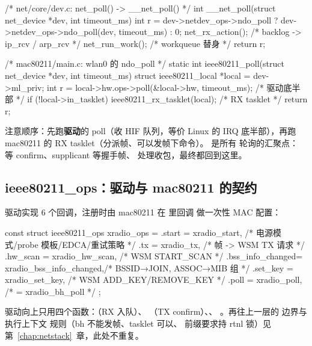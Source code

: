 \begin{ccode}
/* net/core/dev.c: net_poll() -> __net_poll() */
int __net_poll(struct net_device *dev, int timeout_ms)
{
    int r = dev->netdev_ops->ndo_poll
                ? dev->netdev_ops->ndo_poll(dev, timeout_ms) : 0;
    net_rx_action();                    /* backlog -> ip_rcv / arp_rcv */
    net_run_work();                     /* workqueue 替身 */
    return r;
}

/* mac80211/main.c: wlan0 的 ndo_poll */
static int ieee80211_poll(struct net_device *dev, int timeout_ms)
{
    struct ieee80211_local *local = dev->ml_priv;
    int r = local->hw.ops->poll(&local->hw, timeout_ms);   /* 驱动底半部 */
    if (!local->in_tasklet)
        ieee80211_rx_tasklet(local);                       /* RX tasklet */
    return r;
}
\end{ccode}

注意顺序：先跑\textbf{驱动}的 poll（收 HIF 队列，等价 Linux 的 IRQ 底半部），再跑
mac80211 的 RX tasklet（分派帧、可以发帧下命令）。 是所有
轮询的汇聚点： 等 confirm、supplicant 等握手帧、
处理收包，最终都回到这里。

\subsection{ieee80211\_ops：驱动与 mac80211 的契约}

驱动实现 6 个回调，注册时由 mac80211 在  里回调
 做一次性 MAC 配置：

\begin{ccode}
const struct ieee80211_ops xradio_ops = {
    .start           = xradio_start,           /* 电源模式/probe 模板/EDCA/重试策略 */
    .tx              = xradio_tx,              /* 帧 -> WSM TX 请求 */
    .hw_scan         = xradio_hw_scan,         /* WSM START_SCAN */
    .bss_info_changed= xradio_bss_info_changed,/* BSSID→JOIN, ASSOC→MIB 组 */
    .set_key         = xradio_set_key,         /* WSM ADD_KEY/REMOVE_KEY */
    .poll            = xradio_poll,            /* = xradio_bh_poll */
};
\end{ccode}

驱动向上只用四个函数：（RX 入队）、
（TX confirm）、、
。再往上一层的  边界与执行上下文
规则（bh 不能发帧、tasklet 可以、\code{\_\_} 前缀要求持 rtnl 锁）见
第~\ref{chap:netstack}~章，此处不重复。

